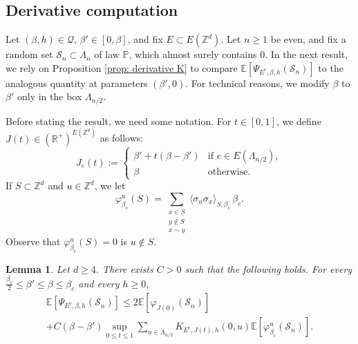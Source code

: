 \documentclass[10pt,a4paper]{amsart}
\numberwithin{equation}{section}
\newtheorem{Lem}[Thm]{Lemma}
\begin{document}
\subsection{Derivative computation}


Let $(\beta,h)\in \mathcal Q$, $\beta'\in [0,\beta]$, and fix $E\subset E(\mathbb Z^d)$. Let $n\geq 1$ be even, and fix a random set $\mathcal S_n\subset \Lambda_n$ of law $\mathbb P$, which almost surely contains $0$. In the next result, we rely on Proposition \ref{prop: derivative K} to compare $\mathbb E[\Psi_{E^c,\beta,h}(\mathcal S_n)]$ to the analogous quantity at parameters $(\beta',0)$. For technical reasons, we modify $\beta$ to $\beta'$ only in the box $\Lambda_{n/2}$.

Before stating the result, we need some notation. For $t\in [0,1]$, we define $J(t)\in (\mathbb R^+)^{E(\mathbb Z^d)}$ as follows: 
\begin{equation}\label{eq: def J}
	J_e(t):=\left\{
			\begin{array}{ll}
				\beta'+t(\beta-\beta') & \mbox{if } e\in E(\Lambda_{n/2}), \\
				\beta & \mbox{otherwise}.
			\end{array}
			\right.
\end{equation}
If $S\subset \mathbb Z^d$ and $u\in \mathbb Z^d$, we let
\begin{equation}
	\varphi_{\beta_c}^u(S)=\sum_{\substack{x\in S\\y\notin S\\x \sim y}}\langle \sigma_u\sigma_x\rangle_{S,\beta_c}\, \beta_c.
\end{equation}
Observe that $\varphi^u_{\beta_c}(S)=0$ is $u \notin S$.


\begin{Lem}\label{lem: derivative} Let $d\geq 4$. There exists $C>0$ such that the following holds. For every $\tfrac{\beta_c}{2}\leq \beta'\leq \beta\leq \beta_c$ and every $h\geq 0$,
\begin{multline}\label{eq: derivative}
	\mathbb E[\Psi_{E^c,\beta,h}(\mathcal S_n)]\leq 2\mathbb E[\varphi_{J(0)}(\mathcal S_n)]\\+C(\beta-\beta') \sup_{0\leq t\leq 1}\sum_{u\in \Lambda_{n/2}}K_{E^c,J(t),h}(0,u)\mathbb E[\varphi_{\beta_c}^u(\mathcal S_n)].
\end{multline}
	
\end{Lem}
\end{document}
